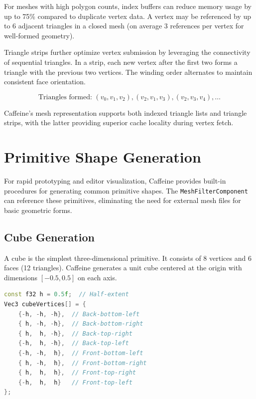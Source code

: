 For meshes with high polygon counts, index buffers can reduce memory usage by up to 75\% compared to duplicate vertex data. A vertex may be referenced by up to 6 adjacent triangles in a closed mesh (on average 3 references per vertex for well-formed geometry).

Triangle strips further optimize vertex submission by leveraging the connectivity of sequential triangles. In a strip, each new vertex after the first two forms a triangle with the previous two vertices. The winding order alternates to maintain consistent face orientation.

\begin{equation}
    \text{Triangles formed: } (v_0, v_1, v_2), (v_2, v_1, v_3), (v_2, v_3, v_4), \ldots
\end{equation}

Caffeine's mesh representation supports both indexed triangle lists and triangle strips, with the latter providing superior cache locality during vertex fetch.

\section{Primitive Shape Generation}

For rapid prototyping and editor visualization, Caffeine provides built-in procedures for generating common primitive shapes. The \texttt{MeshFilterComponent} can reference these primitives, eliminating the need for external mesh files for basic geometric forms.

\subsection{Cube Generation}

A cube is the simplest three-dimensional primitive. It consists of 8 vertices and 6 faces (12 triangles). Caffeine generates a unit cube centered at the origin with dimensions $[-0.5, 0.5]$ on each axis.

\begin{lstlisting}[language=C++, caption=Unit Cube Vertex Layout]
const f32 h = 0.5f;  // Half-extent
Vec3 cubeVertices[] = {
    {-h, -h, -h},  // Back-bottom-left
    { h, -h, -h},  // Back-bottom-right
    { h,  h, -h},  // Back-top-right
    {-h,  h, -h},  // Back-top-left
    {-h, -h,  h},  // Front-bottom-left
    { h, -h,  h},  // Front-bottom-right
    { h,  h,  h},  // Front-top-right
    {-h,  h,  h}   // Front-top-left
};
\end{lstlisting}

